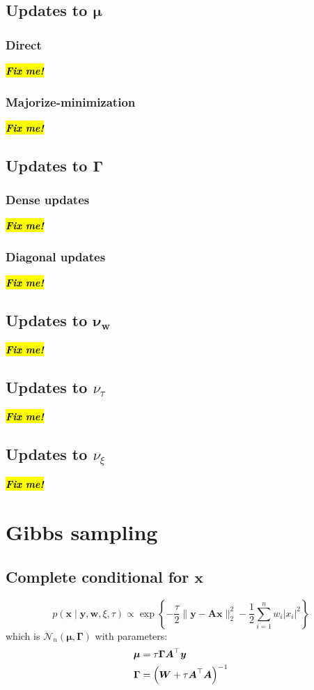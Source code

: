 \documentclass{article}
\newcommand{\fixme}{\hl{\textbf{\emph{Fix me!}}}}
\numberwithin{equation}{section}
\newcommand{\lh}{\mathopen{}\mathclose\bgroup\left}
\newcommand{\rh}{\aftergroup\egroup\right}
\newcommand{\m}[1]{\boldsymbol{#1}}
\begin{document}
\subsection{Updates to $\m{\mu}$}
\subsubsection{Direct}
\fixme{}

\subsubsection{Majorize-minimization}
\fixme{}

\subsection{Updates to $\m{\Gamma}$}
\subsubsection{Dense updates}
\fixme{}

\subsubsection{Diagonal updates}
\fixme{}

\subsection{Updates to $\m{\nu_w}$}
\fixme{}

\subsection{Updates to $\nu_\tau$}
\fixme{}

\subsection{Updates to $\nu_\xi$}
\fixme{}

\clearpage
\section{Gibbs sampling}
\label{s:grls}
\subsection{Complete conditional for $\m{x}$}
\begin{equation}
p(\m{x} \mid \m{y}, \m{w}, \xi, \tau) \propto
 \exp\left\{
  -\frac{\tau}{2} \| \m{y} - \m{A} \m{x} \|_2^2
  -\frac{1}{2} \sum_{i=1}^n w_i |x_i|^2
 \right\}
\end{equation}
which is $\mathcal{N}_n(\m{\mu}, \m{\Gamma})$ with parameters:
\begin{equation}
\begin{aligned}
\m{\mu} &= \tau \m{\Gamma} \m{A}^\top \m{y}
\\
\m{\Gamma} &= \lh( \m{W} + \tau \m{A}^\top \m{A} \rh)^{-1}
\end{aligned}
\end{equation}
\end{document}
